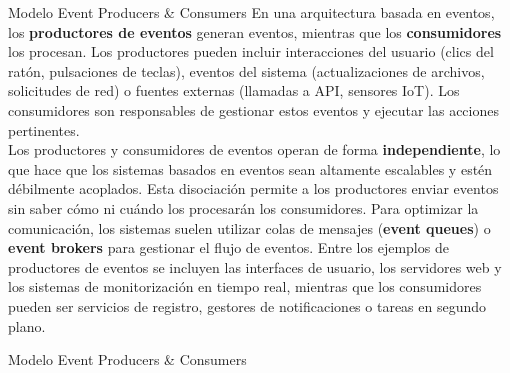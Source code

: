 \documentclass[11pt]{beamer}
\begin{document}
	\begin{frame}{Modelo Event Producers \& Consumers}
		\small \justifying
		En una arquitectura basada en eventos, los \textbf{productores de eventos} generan eventos, mientras que los \textbf{consumidores} los procesan. Los productores pueden incluir interacciones del usuario (clics del ratón, pulsaciones de teclas), eventos del sistema (actualizaciones de archivos, solicitudes de red) o fuentes externas (llamadas a API, sensores IoT). Los consumidores son responsables de gestionar estos eventos y ejecutar las acciones pertinentes. \\
		Los productores y consumidores de eventos operan de forma \textbf{independiente}, lo que hace que los sistemas basados en eventos sean altamente escalables y estén débilmente acoplados. Esta disociación permite a los productores enviar eventos sin saber cómo ni cuándo los procesarán los consumidores. Para optimizar la comunicación, los sistemas suelen utilizar colas de mensajes (\textbf{event queues}) o \textbf{event brokers} para gestionar el flujo de eventos. Entre los ejemplos de productores de eventos se incluyen las interfaces de usuario, los servidores web y los sistemas de monitorización en tiempo real, mientras que los consumidores pueden ser servicios de registro, gestores de notificaciones o tareas en segundo plano.
	\end{frame}

	\begin{frame}[fragile]{Modelo Event Producers \& Consumers}
		\small
	\begin{center}	
	\end{center}
	\end{frame}
	
\end{document}
